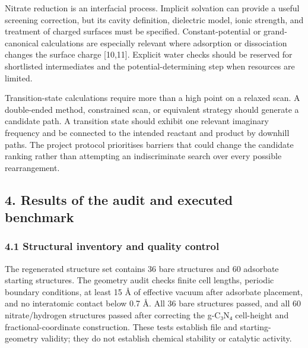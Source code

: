 \documentclass[
]{article}
\begin{document}
Nitrate reduction is an interfacial process. Implicit solvation can
provide a useful screening correction, but its cavity definition,
dielectric model, ionic strength, and treatment of charged surfaces must
be specified. Constant-potential or grand-canonical calculations are
especially relevant where adsorption or dissociation changes the surface
charge {[}10,11{]}. Explicit water checks should be reserved for
shortlisted intermediates and the potential-determining step when
resources are limited.

Transition-state calculations require more than a high point on a
relaxed scan. A double-ended method, constrained scan, or equivalent
strategy should generate a candidate path. A transition state should
exhibit one relevant imaginary frequency and be connected to the
intended reactant and product by downhill paths. The project protocol
prioritises barriers that could change the candidate ranking rather than
attempting an indiscriminate search over every possible rearrangement.

\hypertarget{results-of-the-audit-and-executed-benchmark}{%
\subsection{4. Results of the audit and executed
benchmark}\label{results-of-the-audit-and-executed-benchmark}}

\hypertarget{structural-inventory-and-quality-control}{%
\subsubsection{4.1 Structural inventory and quality
control}\label{structural-inventory-and-quality-control}}

The regenerated structure set contains 36 bare structures and 60
adsorbate starting structures. The geometry audit checks finite cell
lengths, periodic boundary conditions, at least 15 Å of effective vacuum
after adsorbate placement, and no interatomic contact below 0.7 Å. All
36 bare structures passed, and all 60 nitrate/hydrogen structures passed
after correcting the g-C₃N₄ cell-height and fractional-coordinate
construction. These tests establish file and starting-geometry validity;
they do not establish chemical stability or catalytic activity.
\end{document}
